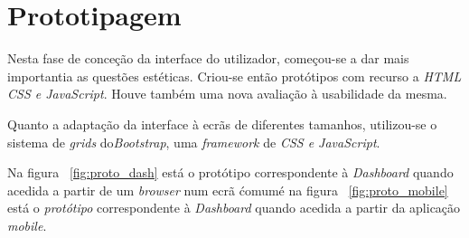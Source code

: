 \section{Prototipagem}

Nesta fase de conceção da interface do utilizador, começou-se a dar mais importantia as questões estéticas. Criou-se então protótipos com recurso a \emph{HTML CSS e JavaScript}. Houve também uma nova avaliação à usabilidade da mesma.

Quanto a adaptação da interface à ecrãs de diferentes tamanhos, utilizou-se o sistema de \emph{grids} do\emph{Bootstrap}, uma \emph{framework} de \emph{CSS e JavaScript}.

Na figura ~\ref{fig:proto_dash} está o protótipo correspondente à \emph{Dashboard} quando acedida a partir de um \emph{browser} num ecrã \'comum\' e na figura ~\ref{fig:proto_mobile} está o \emph{protótipo} correspondente à \emph{Dashboard} quando acedida a partir da aplicação \emph{mobile}.


